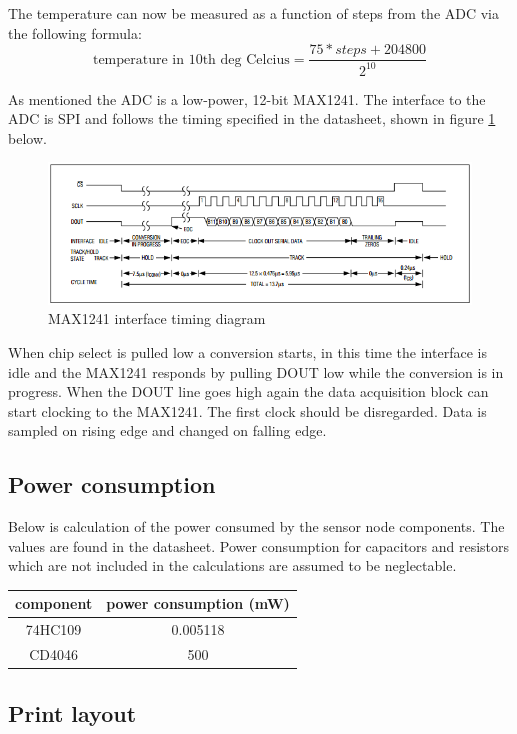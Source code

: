 The temperature can now be measured as a function of steps from the ADC via the following formula:
\begin{equation}
	\text{temperature in 10th deg Celcius} = \frac{75*steps+204800}{2^{10}}
\end{equation}

As mentioned the ADC is a low-power, 12-bit MAX1241. The interface to the ADC is SPI and follows the timing specified in the datasheet, shown in figure \ref{fig:max1241_timing} below.


\begin{figure}[H]
	\centering
	\includegraphics[width=1\textwidth]{billeder/max1241_interface_timing}
	\caption{MAX1241 interface timing diagram}
	\label{fig:max1241_timing}
\end{figure}

When chip select is pulled low a conversion starts, in this time the interface is idle and the MAX1241 responds by pulling DOUT low while the conversion is in progress. When the DOUT line goes high again the data acquisition block can start clocking to the MAX1241. The first clock should be disregarded. Data is sampled on rising edge and changed on falling edge.

\subsection{Power consumption}
Below is calculation of the power consumed by the sensor node components. The values are found in the datasheet. Power consumption for capacitors and resistors which are not included in the calculations are assumed to be neglectable.

\begin{table}[H]
	\centering
	\begin{tabular}{|c|c|}
		\hline
		component 	&	power consumption (mW)\\ \hline
		74HC109 	&	0.005118 \\ \hline
		CD4046		&	500 \\ \hline
		
	\end{tabular}
\end{table}


\subsection{Print layout}







